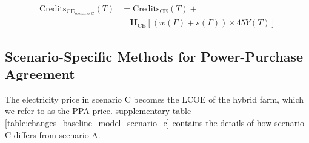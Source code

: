 \documentclass{article}
\begin{document}
\begin{equation}
\begin{aligned}
\text{Credits}_{\text{CE}_{\text{scenario C}}}(T) &= \text{Credits}_{\text{CE}}(T) + \\
&\quad \mathbf{H}_{\text{CE}} \left[ (w(\Gamma) + s(\Gamma)) \times 45Y(T) \right]
\end{aligned}
\label{eq:S60}
\end{equation}

\subsection{Scenario-Specific Methods for Power-Purchase Agreement}

The electricity price in scenario C becomes the LCOE of the hybrid farm, which we refer to as the PPA price. supplementary table \ref{table:changes_baseline_model_scenario_c} contains the details of how scenario C differs from scenario A.
\end{document}
